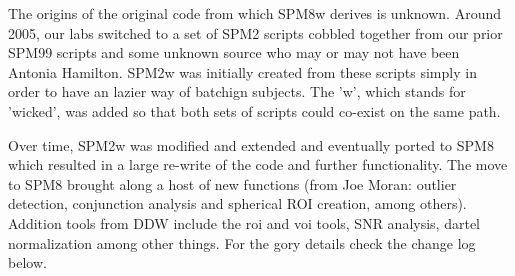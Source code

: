 \documentclass[12pt]{article}
\begin{document}
The origins of the original code from which SPM8w derives is unknown. Around 2005, our labs switched to a set of SPM2 scripts cobbled together from our prior SPM99 scripts and some unknown source who may or may not have been Antonia Hamilton. SPM2w was initially created from these scripts simply in order to have an lazier way of batchign subjects. The 'w', which stands for 'wicked', was added so that both sets of scripts could co-exist on the same path. 

Over time, SPM2w was modified and extended and eventually ported to SPM8 which resulted in a large re-write of the code and further functionality. The move to SPM8 brought along a host of new functions (from Joe Moran: outlier detection, conjunction analysis and spherical ROI creation, among others). Addition tools from DDW include the roi and voi tools, SNR analysis, dartel normalization among other things. For the gory details check the change log below. 
\end{document}
